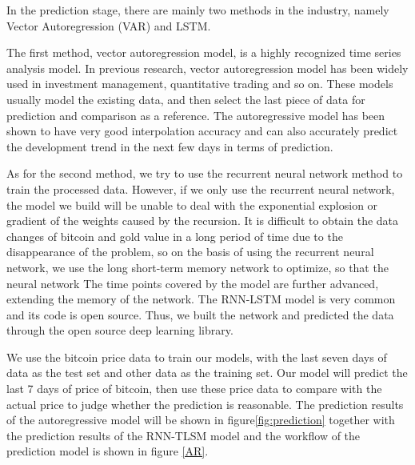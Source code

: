 \documentclass{mcmthesis}
\begin{document}
In the prediction stage, there are mainly two methods in the industry, namely Vector Autoregression (VAR) and LSTM.

The first method, vector autoregression model, is a highly recognized time series analysis model. In previous research, vector autoregression model has been widely used in investment management, quantitative trading and so on. These models usually model the existing data, and then select the last piece of data for prediction and comparison as a reference. The autoregressive model has been shown to have very good interpolation accuracy and can also accurately predict the development trend in the next few days in terms of prediction.

As for the second method, we try to use the recurrent neural network method to train the processed data. However, if we only use the recurrent neural network, the model we build will be unable to deal with the exponential explosion or gradient of the weights caused by the recursion. It is difficult to obtain the data changes of bitcoin and gold value in a long period of time due to the disappearance of the problem, so on the basis of using the recurrent neural network, we use the long short-term memory network to optimize, so that the neural network The time points covered by the model are further advanced, extending the memory of the network. The RNN-LSTM model is very common and its code is open source. Thus, we built the network and predicted the data through the open source deep learning library.

We use the bitcoin price data to train our models, with the last seven days of data as the test set and other data as the training set. Our model will predict the last 7 days of price of bitcoin, then use these price data to compare with the actual price to judge whether the prediction is reasonable.
The prediction results of the autoregressive model will be shown in figure\ref{fig:prediction} together with the prediction results of the RNN-TLSM model and the workflow of the prediction model is shown in figure \ref{AR}.
\end{document}
